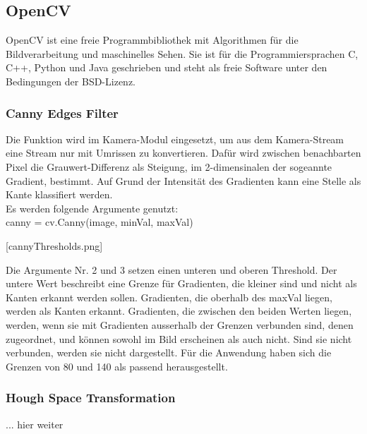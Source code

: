 \subsection{OpenCV}  
\glqq OpenCV ist eine freie Programmbibliothek mit Algorithmen für die
Bildverarbeitung und maschinelles Sehen. Sie ist für die Programmiersprachen C,
C++, Python und Java geschrieben und steht als freie Software unter den
Bedingungen der BSD-Lizenz. \grqq

\subsubsection{Canny Edges Filter}
Die Funktion wird im Kamera-Modul eingesetzt, um aus dem Kamera-Stream eine
Stream nur mit Umrissen zu konvertieren. Dafür wird zwischen benachbarten Pixel
die Grauwert-Differenz als Steigung, im 2-dimensinalen der sogeannte Gradient,
bestimmt. Auf Grund der Intensität des Gradienten kann eine Stelle als Kante
klassifiert werden.\\
Es  werden folgende Argumente genutzt:\\
canny = cv.Canny(image, minVal, maxVal)

[cannyThresholds.png]

Die Argumente Nr. 2 und 3 setzen einen unteren und oberen Threshold. Der untere
Wert beschreibt eine Grenze für Gradienten, die kleiner sind und nicht als
Kanten erkannt werden sollen. Gradienten, die oberhalb des maxVal liegen, werden
als Kanten erkannt. Gradienten, die zwischen den beiden Werten liegen, werden,
wenn sie mit Gradienten ausserhalb der Grenzen verbunden sind, denen zugeordnet,
und können sowohl im Bild erscheinen als auch nicht. Sind sie nicht verbunden,
werden sie nicht dargestellt.
Für die Anwendung haben sich die Grenzen von 80 und 140 als passend herausgestellt.

\subsubsection{Hough Space Transformation}
... hier weiter
